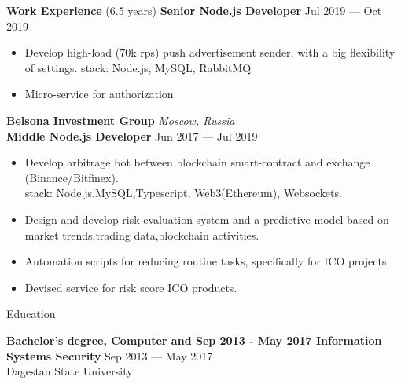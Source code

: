 \documentclass{resume} %
\begin{document}
\begin{rSection}{\textbf{Work Experience} (6.5 years) }
\textbf{Senior Node.js Developer} \hfill Jul 2019 --- Oct 2019
\begin{itemize}
    \setlength\itemsep{-0.3em}
    \item Develop high-load (70k rps) push advertisement sender, with a big flexibility of settings.
    stack: Node.js, MySQL, RabbitMQ
    \item Micro-service for authorization
\end{itemize}

\textbf{Belsona Investment Group} \hfill \textit{Moscow, Russia} \\
\textbf{Middle Node.js Developer}  \hfill Jun 2017 --- Jul 2019
\begin{itemize}
    \setlength\itemsep{-0.3em}
    \item Develop arbitrage bot between blockchain smart-contract and exchange (Binance/Bitfinex).
    	 \\ stack: Node.js,MySQL,Typescript, Web3(Ethereum), Websockets.
    \item Design and develop risk evaluation system and a predictive model based on market trends,trading data,blockchain activities.
    \item Automation scripts for reducing routine tasks, specifically for ICO projects
    \item Devised service for risk score ICO products.
\end{itemize}

\end{rSection}


\begin{rSection}{Education}

\textbf{Bachelor's degree, Computer and Sep 2013 - May 2017 Information Systems Security} \hfill {Sep 2013 --- May 2017} \\
	  Dagestan State University

\end{rSection}
\end{document}
